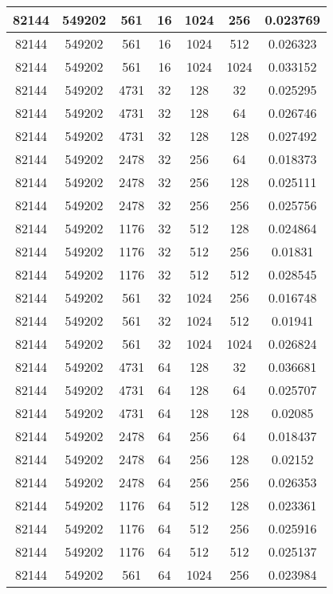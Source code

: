 \documentclass[9pt]{article}
\begin{document}
\begin{tabular}{|c|c|c|c|c|c|c| }
\hline
82144  & 549202  & 561  & 16  & 1024  & 256  & 0.023769 \\
\hline
82144  & 549202  & 561  & 16  & 1024  & 512  & 0.026323 \\
\hline
82144  & 549202  & 561  & 16  & 1024  & 1024  & 0.033152 \\
\hline
82144  & 549202  & 4731  & 32  & 128  & 32  & 0.025295 \\
\hline
82144  & 549202  & 4731  & 32  & 128  & 64  & 0.026746 \\
\hline
82144  & 549202  & 4731  & 32  & 128  & 128  & 0.027492 \\
\hline
82144  & 549202  & 2478  & 32  & 256  & 64  & 0.018373 \\
\hline
82144  & 549202  & 2478  & 32  & 256  & 128  & 0.025111 \\
\hline
82144  & 549202  & 2478  & 32  & 256  & 256  & 0.025756 \\
\hline
82144  & 549202  & 1176  & 32  & 512  & 128  & 0.024864 \\
\hline
82144  & 549202  & 1176  & 32  & 512  & 256  & 0.01831 \\
\hline
82144  & 549202  & 1176  & 32  & 512  & 512  & 0.028545 \\
\hline
82144  & 549202  & 561  & 32  & 1024  & 256  & 0.016748 \\
\hline
82144  & 549202  & 561  & 32  & 1024  & 512  & 0.01941 \\
\hline
82144  & 549202  & 561  & 32  & 1024  & 1024  & 0.026824 \\
\hline
82144  & 549202  & 4731  & 64  & 128  & 32  & 0.036681 \\
\hline
82144  & 549202  & 4731  & 64  & 128  & 64  & 0.025707 \\
\hline
82144  & 549202  & 4731  & 64  & 128  & 128  & 0.02085 \\
\hline
82144  & 549202  & 2478  & 64  & 256  & 64  & 0.018437 \\
\hline
82144  & 549202  & 2478  & 64  & 256  & 128  & 0.02152 \\
\hline
82144  & 549202  & 2478  & 64  & 256  & 256  & 0.026353 \\
\hline
82144  & 549202  & 1176  & 64  & 512  & 128  & 0.023361 \\
\hline
82144  & 549202  & 1176  & 64  & 512  & 256  & 0.025916 \\
\hline
82144  & 549202  & 1176  & 64  & 512  & 512  & 0.025137 \\
\hline
82144  & 549202  & 561  & 64  & 1024  & 256  & 0.023984 \\

\end{tabular}
\end{document}
